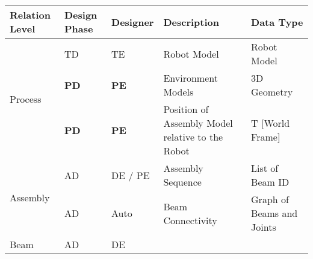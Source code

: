 \begin{table}[H]
\begin{adjustbox}{max width=\textwidth}
\begin{tabular}{p{2.09cm}p{1.51cm}p{1.93cm}p{5.92cm}p{4.48cm}}
\hline
\multicolumn{1}{|p{2.09cm}}{{\footnotesize \textbf{Relation Level}}} & 
\multicolumn{1}{|p{1.51cm}}{{\footnotesize \textbf{Design Phase}}} & 
\multicolumn{1}{|p{1.93cm}}{{\footnotesize \textbf{Designer}}} & 
\multicolumn{1}{|p{5.92cm}}{{\footnotesize \textbf{Description}}} & 
\multicolumn{1}{|p{4.48cm}|}{{\footnotesize \textbf{Data Type}}} \\ 
\hline
\multicolumn{1}{|p{2.09cm}}{\multirow{3}{*}{\parbox{2.09cm}{{\footnotesize Process}}}} & 
\multicolumn{1}{|p{1.51cm}}{{\footnotesize TD}} & 
\multicolumn{1}{|p{1.93cm}}{{\footnotesize TE}} & 
\multicolumn{1}{|p{5.92cm}}{{\footnotesize Robot Model}} & 
\multicolumn{1}{|p{4.48cm}|}{{\footnotesize Robot Model}} \\ 
\hhline{~----}
\multicolumn{1}{|p{2.09cm}}{} & 
\multicolumn{1}{|p{1.51cm}}{{\footnotesize \textbf{PD}}} & 
\multicolumn{1}{|p{1.93cm}}{{\footnotesize \textbf{PE}}} & 
\multicolumn{1}{|p{5.92cm}}{{\footnotesize Environment Models}} & 
\multicolumn{1}{|p{4.48cm}|}{{\footnotesize 3D Geometry}} \\ 
\hhline{~----}
\multicolumn{1}{|p{2.09cm}}{} & 
\multicolumn{1}{|p{1.51cm}}{{\footnotesize \textbf{PD}}} & 
\multicolumn{1}{|p{1.93cm}}{{\footnotesize \textbf{PE}}} & 
\multicolumn{1}{|p{5.92cm}}{{\footnotesize Position of Assembly Model relative to the Robot }} & 
\multicolumn{1}{|p{4.48cm}|}{{\footnotesize T [World Frame]}} \\ 
\hline
\multicolumn{1}{|p{2.09cm}}{\multirow{2}{*}{\parbox{2.09cm}{{\footnotesize Assembly}}}} & 
\multicolumn{1}{|p{1.51cm}}{{\footnotesize AD}} & 
\multicolumn{1}{|p{1.93cm}}{{\footnotesize DE / PE}} & 
\multicolumn{1}{|p{5.92cm}}{{\footnotesize Assembly Sequence}} & 
\multicolumn{1}{|p{4.48cm}|}{{\footnotesize List of Beam ID}} \\ 
\hhline{~----}
\multicolumn{1}{|p{2.09cm}}{} & 
\multicolumn{1}{|p{1.51cm}}{{\footnotesize AD}} & 
\multicolumn{1}{|p{1.93cm}}{{\footnotesize Auto}} & 
\multicolumn{1}{|p{5.92cm}}{{\footnotesize Beam Connectivity}} & 
\multicolumn{1}{|p{4.48cm}|}{{\footnotesize Graph of Beams and Joints}} \\ 
\hline
\multicolumn{1}{|p{2.09cm}}{\multirow{8}{*}{\parbox{2.09cm}{{\footnotesize Beam}}}} & 
\multicolumn{1}{|p{1.51cm}}{{\footnotesize AD}} & 
\multicolumn{1}{|p{1.93cm}}{{\footnotesize DE}} & 

\end{tabular}
\end{adjustbox}
\end{table}
